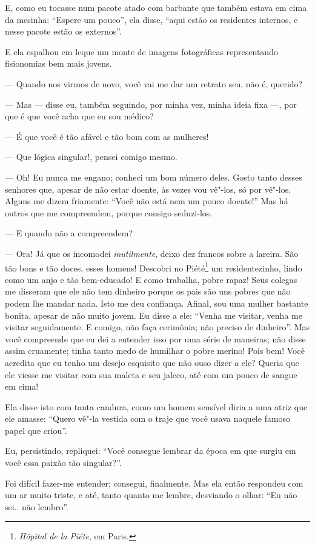 E, como eu tocasse num pacote atado com barbante que também estava em cima da
mesinha: “Espere um pouco'', ela disse, “aqui estão os residentes internos, e nesse pacote estão os externos''.

E ela espalhou em leque um monte de imagens fotográficas 
representando fisionomias bem mais jovens.

--- Quando nos virmos de novo, você vai me dar um retrato seu,
não é, querido?

--- Mas --- disse eu, também seguindo, por minha vez, minha ideia fixa ---,
por que é que você acha que eu sou médico?

--- É que você é tão afável e tão bom com as mulheres!

--- Que lógica singular!, pensei comigo mesmo.

--- Oh! Eu nunca me engano; conheci um bom número deles. Gosto tanto
desses senhores que, apesar de não estar doente, às vezes vou vê"-los,
só por vê"-los. Alguns me dizem friamente: “Você não
está nem um pouco doente!'' Mas há outros que me
compreendem, porque consigo seduzi-los.

--- E quando não a compreendem?

--- Ora! Já que os incomodei \textit{inutilmente}, deixo dez francos sobre a
lareira. São tão bons e tão doces, esses homens!
Descobri no
Piété\footnote{  \textit{Hôpital de la Piéte}, em Paris.}
 um residentezinho, lindo como um anjo
e tão bem-educado! E como trabalha, pobre rapaz! Seus colegas me
disseram que ele não tem dinheiro porque os pais são uns pobres que
não podem lhe mandar nada. Isto me deu confiança. Afinal, sou uma
mulher bastante bonita, apesar de não muito jovem. Eu disse a ele:
“Venha me visitar, venha me visitar seguidamente. E
comigo, não faça cerimônia; não preciso de dinheiro''. Mas
você compreende que eu dei a entender isso por uma série de
maneiras; não disse assim cruamente; tinha tanto medo de
humilhar o pobre merino! Pois bem! Você acredita que eu tenho um
desejo esquisito que não ouso dizer a ele? Queria que ele viesse
me visitar com sua maleta e seu jaleco, até com um pouco de sangue em
cima!

Ela disse isto com tanta candura, como um homem sensível diria a
uma atriz que ele amasse: “Quero vê"-la vestida com o
traje que você usava naquele famoso papel que criou''.

Eu, persistindo, repliquei: “Você consegue lembrar da época
em que surgiu em você essa paixão tão singular?''.

Foi difícil fazer-me entender; consegui, finalmente. Mas ela então respondeu
com um ar muito triste, e até, tanto quanto me lembre, desviando o
olhar: “Eu não sei.. não lembro''.

